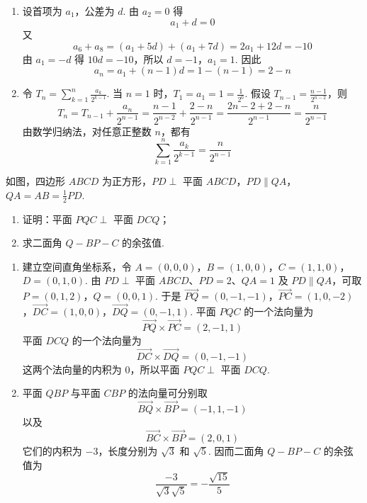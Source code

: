 \begin{solution}
\begin{enumerate}
\item 设首项为 \(a_{1}\)，公差为 \(d\). 由 \(a_{2}=0\) 得
\[
a_{1}+d=0
\]
又
\[
a_{6}+a_{8}=(a_{1}+5d)+(a_{1}+7d)=2a_{1}+12d=-10
\]
由 \(a_{1}=-d\) 得 \(10d=-10\)，所以 \(d=-1\)，\(a_{1}=1\). 因此
\[
a_{n}=a_{1}+(n-1)d=1-(n-1)=2-n
\]
\item 令
\(T_{n}=\sum_{k=1}^{n}\frac{a_{k}}{2^{k-1}}\).
当 \(n=1\) 时，\(T_{1}=a_{1}=1=\frac1{2^{0}}\). 假设 \(T_{n-1}=\frac{n-1}{2^{n-2}}\)，则
\[
T_{n}=T_{n-1}+\frac{a_{n}}{2^{n-1}}
=\frac{n-1}{2^{n-2}}+\frac{2-n}{2^{n-1}}
=\frac{2n-2+2-n}{2^{n-1}}
=\frac{n}{2^{n-1}}
\]
由数学归纳法，对任意正整数 \(n\)，都有
\[
\sum_{k=1}^{n}\frac{a_{k}}{2^{k-1}}=\frac{n}{2^{n-1}}
\]
\end{enumerate}
\end{solution}

\begin{problem}
如图，四边形 \(ABCD\) 为正方形，\(PD \perp\) 平面 \(ABCD\)，\(PD \parallel QA\)，\(QA = AB = \frac{1}{2} PD\).
\begin{enumerate}
\item 证明：平面 \(PQC \perp\) 平面 \(DCQ\)；
\item 求二面角 \(Q - BP - C\) 的余弦值.
\end{enumerate}

\end{problem}

\begin{solution}
\begin{enumerate}
\item 建立空间直角坐标系，令
\(A=(0,0,0)\)，\(B=(1,0,0)\)，\(C=(1,1,0)\)，\(D=(0,1,0)\).
由 \(PD\perp\) 平面 \(ABCD\)、\(PD=2\)、\(QA=1\) 及 \(PD\parallel QA\)，可取
\(P=(0,1,2)\)，\(Q=(0,0,1)\).
于是 \(\overrightarrow{PQ}=(0,-1,-1)\)，\(\overrightarrow{PC}=(1,0,-2)\)，\(\overrightarrow{DC}=(1,0,0)\)，\(\overrightarrow{DQ}=(0,-1,1)\).
平面 \(PQC\) 的一个法向量为
\[
\overrightarrow{PQ}\times\overrightarrow{PC}=(2,-1,1)
\]
平面 \(DCQ\) 的一个法向量为
\[
\overrightarrow{DC}\times\overrightarrow{DQ}=(0,-1,-1)
\]
这两个法向量的内积为 \(0\)，所以平面 \(PQC\perp\) 平面 \(DCQ\).
\item 平面 \(QBP\) 与平面 \(CBP\) 的法向量可分别取
\[
\overrightarrow{BQ}\times\overrightarrow{BP}=(-1,1,-1)
\]
以及
\[
\overrightarrow{BC}\times\overrightarrow{BP}=(2,0,1)
\]
它们的内积为 \(-3\)，长度分别为 \(\sqrt3\) 和 \(\sqrt5\). 因而二面角 \(Q-BP-C\) 的余弦值为
\[
\frac{-3}{\sqrt3\sqrt5}=-\frac{\sqrt{15}}5
\]
\end{enumerate}
\end{solution}

